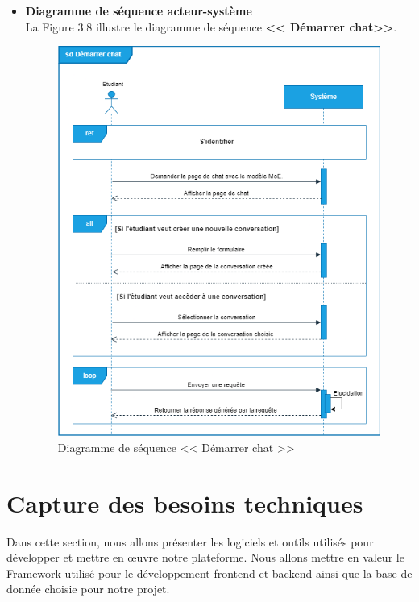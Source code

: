 \begin{itemize}[itemsep=1pt, parsep=1pt]
    \item \textbf{Diagramme de séquence acteur-système}\\
    La Figure 3.8 illustre le diagramme de séquence \textbf{<< Démarrer chat>>}.
     \begin{figure}[H]
        \centering
        \includegraphics[width=1.1\textwidth,height=0.85\textheight]{images/chp3/fig8.png}     
           \caption{Diagramme de séquence << Démarrer chat >>}        
        \label{fig:Diagramme de séquence << Démarrer chat >>}    
    \end{figure}
    
\end{itemize}

\section{Capture des besoins techniques}
Dans cette section, nous allons présenter les logiciels et outils utilisés pour développer et mettre en œuvre notre plateforme. Nous allons mettre en valeur le Framework utilisé pour le développement frontend et backend ainsi que la base de donnée choisie pour notre projet.

